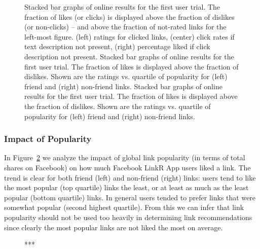 \begin{figure}[t!]
\caption{Stacked bar graphs of online results for the first 
user trial.  The fraction of likes (or clicks) is displayed above 
the fraction of dislikes (or non-clicks) -- and above the fraction of not-rated
links for the left-most figure.  
(left) ratings for clicked links, (center) click rates if
text description not present, 
(right) percentage liked if click description not present.
Stacked bar graphs of online results for the first 
user trial.  The fraction of likes is displayed above the fraction of
dislikes.  Shown are the ratings vs. quartile of popularity for (left)
friend and (right) non-friend links.
Stacked bar graphs of online results for the first 
user trial.  The fraction of likes is displayed above the fraction of
dislikes.  Shown are the ratings vs. quartile of popularity for (left)
friend and (right) non-friend links.
}
\label{fig:click_evidence}
\end{figure}

\subsubsection{Impact of Popularity}

In Figure~\ref{fig:popularity} we analyze the impact of global link
popularity (in terms of total shares on Facebook) 
on how much Facebook LinkR App users liked a link.
The trend is clear for both friend (left) and non-friend (right)
links: users tend to like the most popular (top quartile) 
links the least, or at least as much as the least popular (bottom quartile)
links.  In general users tended to prefer links that were somewhat
popular (second highest quartile).  From this we can infer that
link popularity should not be used too heavily in determining link
recommendations since clearly the most popular links are not liked
the most on average.

\begin{figure}[t!]
\centering
\caption{***}
\label{fig:popularity}
\end{figure}

